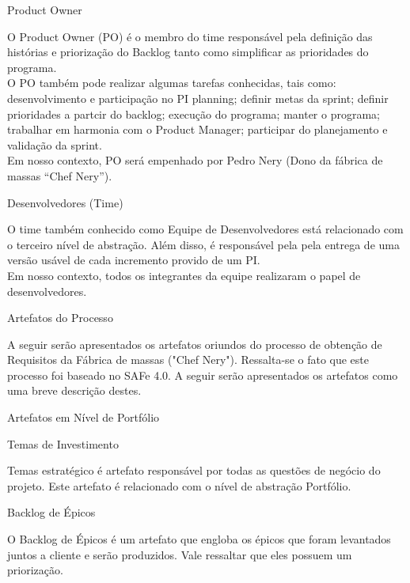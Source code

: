 {
	\large{Product Owner\\}

	\tab O Product Owner (PO) é o membro do time responsável pela definição das histórias e priorização do Backlog tanto como simplificar as prioridades do programa. \\
	\tab O PO também pode realizar algumas tarefas conhecidas, tais como: desenvolvimento e participação no PI planning; definir metas da sprint; definir prioridades  a partcir do backlog; execução do programa; manter o programa; trabalhar em harmonia com o Product Manager; participar do planejamento e validação da sprint. \\
	\tab Em nosso contexto, PO será empenhado por Pedro Nery (Dono da fábrica de massas “Chef Nery”). \\
}

{
	\large{Desenvolvedores (Time)\\}

	\tab O time também conhecido como Equipe de Desenvolvedores está relacionado com o terceiro nível de abstração. Além disso, é responsável pela pela entrega de uma versão usável de cada incremento provido de um PI. \\
	\tab Em nosso contexto, todos os integrantes da equipe realizaram o papel de desenvolvedores. \\

}

{
	\large{Artefatos do Processo \\}

	\tab A seguir serão apresentados os artefatos oriundos do processo de obtenção de Requisitos da Fábrica de massas ("Chef Nery"). Ressalta-se o fato que este processo foi baseado no SAFe 4.0. A seguir serão apresentados os artefatos como uma breve descrição destes. \\

}

{\large{Artefatos em Nível de Portfólio \\}}

{
	\large{Temas de Investimento \\}

	\tab Temas estratégico é artefato responsável por todas as questões de negócio do projeto. Este artefato é relacionado com o nível de abstração Portfólio. \\
}


{
	\large{Backlog de  Épicos \\}

	\tab O Backlog de Épicos é um artefato que engloba os épicos que foram levantados juntos a cliente e serão produzidos. Vale ressaltar que eles possuem um priorização. \\
}

